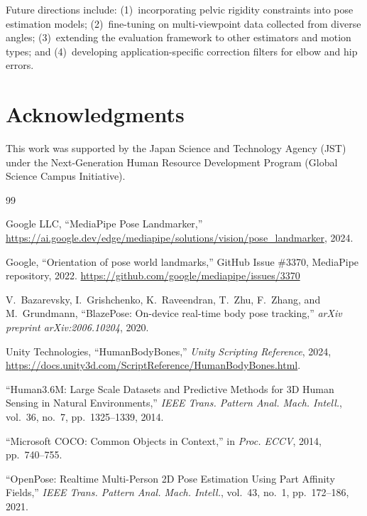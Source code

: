 \documentclass[twocolumn]{article}
\begin{document}
Future directions include: (1)~incorporating pelvic rigidity constraints
into pose estimation models; (2)~fine-tuning on multi-viewpoint data
collected from diverse angles; (3)~extending the evaluation framework to
other estimators and motion types; and (4)~developing application-specific
correction filters for elbow and hip errors.

\section*{Acknowledgments}

This work was supported by the Japan Science and Technology Agency (JST)
under the Next-Generation Human Resource Development Program (Global Science
Campus Initiative).

\begin{thebibliography}{99}

Google LLC, ``MediaPipe Pose Landmarker,''
\url{https://ai.google.dev/edge/mediapipe/solutions/vision/pose_landmarker},
2024.

Google, ``Orientation of pose world landmarks,''
GitHub Issue \#3370, MediaPipe repository, 2022.
\url{https://github.com/google/mediapipe/issues/3370}

V.~Bazarevsky, I.~Grishchenko, K.~Raveendran, T.~Zhu, F.~Zhang,
and M.~Grundmann,
``BlazePose: On-device real-time body pose tracking,''
\textit{arXiv preprint arXiv:2006.10204}, 2020.

Unity Technologies, ``HumanBodyBones,''
\textit{Unity Scripting Reference}, 2024,
\url{https://docs.unity3d.com/ScriptReference/HumanBodyBones.html}.

``Human3.6M: Large Scale Datasets and Predictive Methods for 3D Human
Sensing in Natural Environments,''
\textit{IEEE Trans. Pattern Anal. Mach. Intell.}, vol.~36, no.~7,
pp.~1325--1339, 2014.

``Microsoft COCO: Common Objects in Context,''
in \textit{Proc. ECCV}, 2014, pp.~740--755.

``OpenPose: Realtime Multi-Person 2D Pose Estimation Using Part Affinity
Fields,''
\textit{IEEE Trans. Pattern Anal. Mach. Intell.}, vol.~43, no.~1,
pp.~172--186, 2021.


\end{thebibliography}
\end{document}
